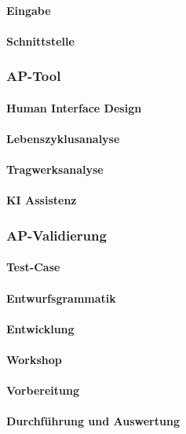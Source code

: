 \documentclass[type=zwischenbericht]{zukunftbau}
\begin{document}
\paragraph{Eingabe}

\paragraph{Schnittstelle}

\subsubsection{AP-Tool}

\paragraph{Human Interface Design}

\paragraph{Lebenszyklusanalyse}

\paragraph{Tragwerksanalyse}

\paragraph{KI Assistenz}

\subsubsection{AP-Validierung}

\paragraph{Test-Case}
\begin{SemioNest}
\paragraph{Entwurfsgrammatik}
\paragraph{Entwicklung}
\end{SemioNest}

\paragraph{Workshop}
\begin{SemioNest}
\paragraph{Vorbereitung}
\paragraph{Durchführung und Auswertung}
\end{SemioNest}
\end{document}
